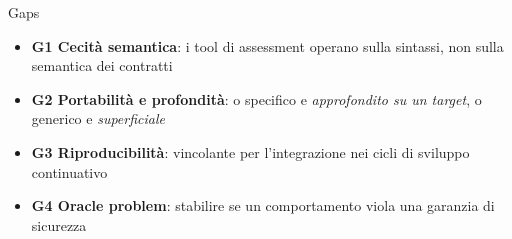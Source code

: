 
\begin{frame}{Gaps}
  \begin{itemize}
    \item \textbf{G1 Cecità semantica}: i \alert{tool di assessment} operano sulla \alert{sintassi}, non sulla \alert{semantica} dei contratti

    \item \textbf{G2 Portabilità e profondità}: o \alert{specifico} e \textit{approfondito su un target}, o \alert{generico} e \textit{superficiale}

    \item \textbf{G3 Riproducibilità}: vincolante per l'integrazione nei cicli di \alert{sviluppo continuativo}

    \item \textbf{G4 Oracle problem}: stabilire se un \alert{comportamento} viola una \alert{garanzia di sicurezza}
  \end{itemize}
\end{frame}